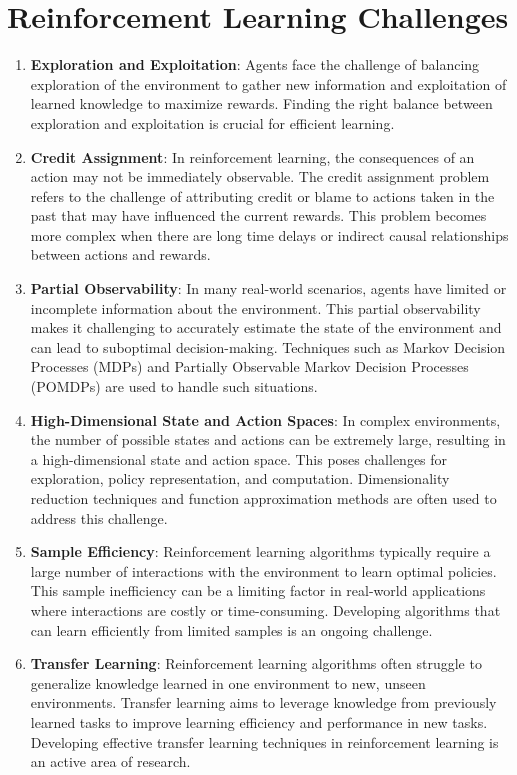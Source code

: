 \section{Reinforcement Learning Challenges}
\begin{enumerate}
	\item \textbf{Exploration and Exploitation}: Agents face the challenge of balancing exploration of the environment to gather new information and exploitation of learned knowledge to maximize rewards. Finding the right balance between exploration and exploitation is crucial for efficient learning.
	\item \textbf{Credit Assignment}: In reinforcement learning, the consequences of an action may not be immediately observable. The credit assignment problem refers to the challenge of attributing credit or blame to actions taken in the past that may have influenced the current rewards. This problem becomes more complex when there are long time delays or indirect causal relationships between actions and rewards.
	\item \textbf{Partial Observability}: In many real-world scenarios, agents have limited or incomplete information about the environment. This partial observability makes it challenging to accurately estimate the state of the environment and can lead to suboptimal decision-making. Techniques such as Markov Decision Processes (MDPs) and Partially Observable Markov Decision Processes (POMDPs) are used to handle such situations.
	\item \textbf{High-Dimensional State and Action Spaces}: In complex environments, the number of possible states and actions can be extremely large, resulting in a high-dimensional state and action space. This poses challenges for exploration, policy representation, and computation. Dimensionality reduction techniques and function approximation methods are often used to address this challenge.
	\item \textbf{Sample Efficiency}: Reinforcement learning algorithms typically require a large number of interactions with the environment to learn optimal policies. This sample inefficiency can be a limiting factor in real-world applications where interactions are costly or time-consuming. Developing algorithms that can learn efficiently from limited samples is an ongoing challenge.
	\item \textbf{Transfer Learning}: Reinforcement learning algorithms often struggle to generalize knowledge learned in one environment to new, unseen environments. Transfer learning aims to leverage knowledge from previously learned tasks to improve learning efficiency and performance in new tasks. Developing effective transfer learning techniques in reinforcement learning is an active area of research.

\end{enumerate}
